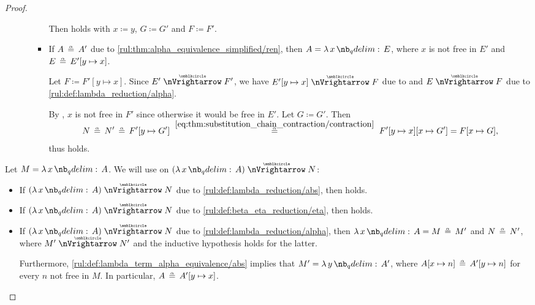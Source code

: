 \begin{proof}
\begin{itemize}
\begin{itemize}
\begin{itemize}
        Then  holds with \( x \coloneqq y \), \( G \coloneqq G' \) and \( F \coloneqq F' \).

        \item If \( A \aequiv A' \) due to \ref{rul:thm:alpha_equivalence_simplified/ren}, then \( A = \qabs x E \), where \( x \) is not free in \( E' \) and \( E \aequiv E'[y \mapsto x] \).

        Let \( F \coloneqq F'[y \mapsto x] \). Since \( E' \ppred F' \), we have \( E'[y \mapsto x] \ppred F \) due to  and \( E \ppred F \) due to \ref{rul:def:lambda_reduction/alpha}.

        By , \( x \) is not free in \( F' \) since otherwise it would be free in \( E' \). Let \( G \coloneqq G' \). Then
        \begin{equation*}
          N
          \aequiv
          N'
          \aequiv
          F'[y \mapsto G']
          \reloset {\eqref{eq:thm:substitution_chain_contraction/contraction}} \aequiv
          F'[y \mapsto x][x \mapsto G']
          =
          F[x \mapsto G],
        \end{equation*}
        thus  holds.
      \end{itemize}
    \end{itemize}
  \end{itemize}

   Let \( M = \qabs x A \). We will use  on \( (\qabs x A) \ppred N \):
  \begin{itemize}
    \item If \( (\qabs x A) \ppred N \) due to \ref{rul:def:lambda_reduction/abs}, then  holds.

    \item If \( (\qabs x A) \ppred N \) due to \ref{rul:def:beta_eta_reduction/eta}, then  holds.

    \item If \( (\qabs x A) \ppred N \) due to \ref{rul:def:lambda_reduction/alpha}, then \( \qabs x A = M \aequiv M' \) and \( N \aequiv N' \), where \( M' \ppred N' \) and the inductive hypothesis holds for the latter.

    Furthermore, \ref{rul:def:lambda_term_alpha_equivalence/abs} implies that \( M' = \qabs y A' \), where \( A[x \mapsto n] \aequiv A'[y \mapsto n] \) for every \( n \) not free in \( M \). In particular, \( A \aequiv A'[y \mapsto x] \).


\end{itemize}
\end{proof}
